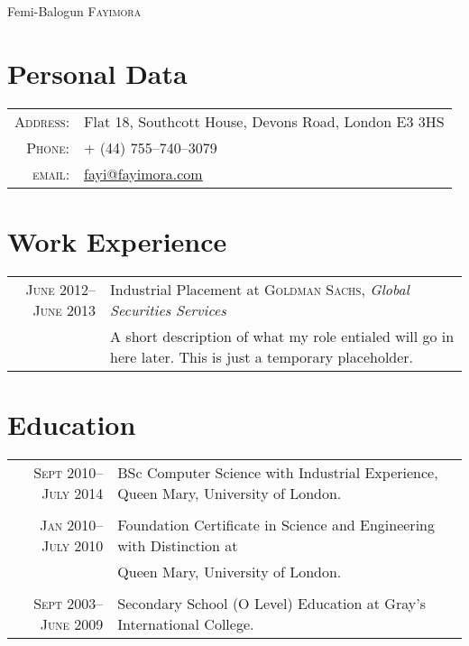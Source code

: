 \documentclass[a4paper,10pt]{article}
\begin{document}
\pagestyle{empty} %


\par{\centering
  {\Huge Femi-Balogun \textsc{Fayimora}
}\bigskip\par}

\section{Personal Data}

\begin{tabular}{rl}
  \textsc{Address:}   & Flat 18, Southcott House, Devons Road, London E3 3HS \\
  \textsc{Phone:}     & + (44) 755--740--3079 \\
  \textsc{email:}     & \href{mailto:fayi@fayimora.com}{fayi@fayimora.com}
\end{tabular}

\section{Work Experience}
\begin{tabular}{r|p{11cm}}
  \textsc{June 2012--June 2013} & Industrial Placement at \textsc{Goldman Sachs}, \emph{Global
  Securities Services}\\&\footnotesize{A short description of what my role entialed will go in here
  later. This is just a temporary placeholder.}
\end{tabular}

\section{Education}
\begin{tabular}{rl}
  \textsc{Sept} 2010--\textsc{July} 2014 & BSc Computer Science with Industrial Experience, Queen
  Mary, University of London.\\&\\

  \textsc{Jan} 2010--\textsc{July} 2010 & Foundation Certificate in Science and Engineering with
  Distinction at\\& Queen Mary, University of London.\\&\\

  \textsc{Sept} 2003--\textsc{June} 2009 & Secondary School (O Level) Education at Gray’s
  International College.
\end{tabular}
\end{document}
